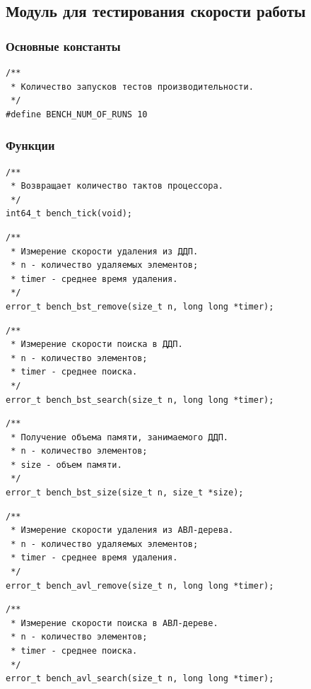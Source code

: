 \documentclass[a4paper,12pt]{extarticle}
\begin{document}
\subsection{Модуль для тестирования скорости работы}
\subsubsection{Основные константы}
\begin{verbatim}
/**
 * Количество запусков тестов производительности.
 */
#define BENCH_NUM_OF_RUNS 10
\end{verbatim}

\subsubsection{Функции}
\begin{verbatim}
/**
 * Возвращает количество тактов процессора.
 */
int64_t bench_tick(void);
\end{verbatim}

\begin{verbatim}
/**
 * Измерение скорости удаления из ДДП.
 * n - количество удаляемых элементов;
 * timer - среднее время удаления.
 */
error_t bench_bst_remove(size_t n, long long *timer);
\end{verbatim}

\begin{verbatim}
/**
 * Измерение скорости поиска в ДДП.
 * n - количество элементов;
 * timer - среднее поиска.
 */
error_t bench_bst_search(size_t n, long long *timer);
\end{verbatim}

\begin{verbatim}
/**
 * Получение объема памяти, занимаемого ДДП.
 * n - количество элементов;
 * size - объем памяти.
 */
error_t bench_bst_size(size_t n, size_t *size);
\end{verbatim}

\begin{verbatim}
/**
 * Измерение скорости удаления из АВЛ-дерева.
 * n - количество удаляемых элементов;
 * timer - среднее время удаления.
 */
error_t bench_avl_remove(size_t n, long long *timer);
\end{verbatim}

\begin{verbatim}
/**
 * Измерение скорости поиска в АВЛ-дереве.
 * n - количество элементов;
 * timer - среднее поиска.
 */
error_t bench_avl_search(size_t n, long long *timer);
\end{verbatim}
\end{document}

